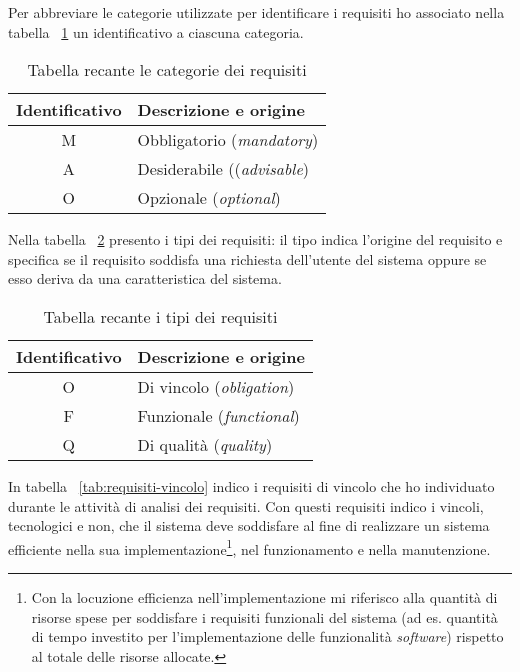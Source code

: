Per abbreviare le categorie utilizzate per identificare i requisiti ho associato nella tabella ~\ref{tab:categoria-requisiti} un identificativo a ciascuna categoria.

\begin{table}[H]
\caption{Tabella recante le categorie dei requisiti}
\label{tab:categoria-requisiti}
\begin{tabularx}{\linewidth}{|c|X|}
\hline
\textbf{Identificativo} & \textbf{Descrizione e origine} \\
\hline
M & Obbligatorio (\emph{mandatory}) \\
\hline
A & Desiderabile ((\emph{advisable}) \\
\hline
O & Opzionale (\emph{optional}) \\
\hline
\end{tabularx}
\end{table}

Nella tabella ~\ref{tab:tipi-requisiti} presento i tipi dei requisiti: il tipo indica l'origine del requisito e specifica se il requisito soddisfa una richiesta dell'utente del sistema oppure se esso deriva da una caratteristica del sistema.

\begin{table}[H]
\caption{Tabella recante i tipi dei requisiti}
\label{tab:tipi-requisiti}
\begin{tabularx}{\linewidth}{|c|X|}
\hline
\textbf{Identificativo} & \textbf{Descrizione e origine} \\
\hline
O & Di vincolo (\emph{obligation}) \\
\hline
F & Funzionale (\emph{functional}) \\
\hline
Q & Di qualità (\emph{quality}) \\
\hline
\end{tabularx}
\end{table}


In tabella ~\ref{tab:requisiti-vincolo} indico i requisiti di vincolo che ho individuato durante le attività di analisi dei requisiti. Con questi requisiti indico i vincoli, tecnologici e non, che il sistema deve soddisfare al fine di realizzare un sistema efficiente nella sua implementazione\footnote{Con la locuzione efficienza nell'implementazione mi riferisco alla quantità di risorse spese per soddisfare i requisiti funzionali del sistema (ad es. quantità di tempo investito per l'implementazione delle funzionalità \emph{software}) rispetto al totale delle risorse allocate.}, nel funzionamento e nella manutenzione.

